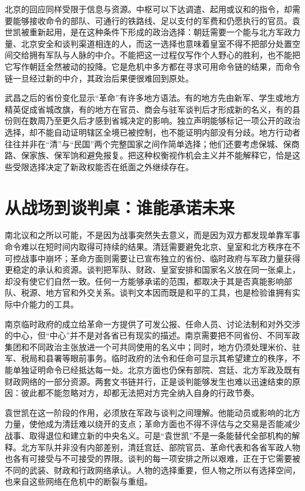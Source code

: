 北京的回应同样受限于信息与资源。中枢可以下达调遣、起用或议和的指令，却需要能够接收命令的部队、可通行的铁路线、足以支付的军费和仍愿执行的官员。袁世凯被重新起用，是在这种条件下形成的政治选择：朝廷需要一个能与北方军政力量、北京安全和谈判渠道相连的人，而这一选择也意味着皇室不得不把部分处置空间交给拥有军队与人脉的中介。不能把这一过程仅写作个人野心的胜利，也不能把它写作朝廷全然被动的投降。它是危机中多方都在寻求可用命令链的结果，而命令链一旦经过新的中介，其政治后果便很难回到原处。

武昌之后的省份变化显示“革命”有许多地方语法。有的地方先由新军、学生或地方精英促成省城改旗，有的地方在官员、商会与驻军谈判后才形成新的名义，有的县份则在数周乃至更久后才感到省城决定的影响。独立声明能够标记一项公开的政治选择，却不能自动证明辖区全境已被控制，也不能证明内部没有分歧。地方行动者往往并非在“清”与“民国”两个完整国家之间作简单选择；他们还要考虑保城、保商路、保家族、保军饷和避免报复。把这种权衡视作机会主义并不能解释它，恰是这些受限选择决定了新政权能否在纸面之外继续存在。

\section{从战场到谈判桌：谁能承诺未来}

南北议和之所以可能，不是因为战事突然失去意义，而是因为双方都发现单靠军事命令难以在短时间内取得可持续的结果。清廷需要避免北京、皇室和北方秩序在不可控战事中崩坏；革命方面则需要让已宣布独立的省份、临时政府与军政力量获得更稳定的承认和资源。谈判把军队、财政、皇室安排和国家名义放在同一张桌上，却没有使它们自然一致。任何一方能够承诺的范围，都取决于其是否真能影响部队、税源、地方官和外交关系。谈判文本因而既是和平的工具，也是检验谁拥有实际中介能力的工具。

南京临时政府的成立给革命一方提供了可发公报、任命人员、讨论法制和对外交涉的中心，但“中心”并不是对各省已有现实的描述。南京需要把不同省份、不同军政集团和不同政治主张放进一个可共同使用的名义中；同时，地方仍须处理米价、驻军、税局和县署等眼前事务。临时政府的法令和任命可显示其希望建立的秩序，不能单独证明命令已经抵达每一处。北京方面也仍保有部院、宫廷、北方军政及既有财政网络的一部分资源。两套文书链并行，正是谈判能够发生也难以迅速结束的原因：彼此都不能忽略对方，却都无法把对方完全纳入自身的行政节奏。

袁世凯在这一阶段的作用，必须放在军政与谈判之间理解。他能动员或影响的北方力量，使他成为清廷难以绕开的支点；革命方面也不得不评估与之交易是否能减少战事、取得退位和建立新的中央名义。可是“袁世凯”不是一条能替代全部机构的解释。北方军队并非没有内部差别，清廷宫廷、部院官员、革命代表和各省军政人物也各有可接受与不可接受的界限。谈判的每一项安排之所以艰难，正在于它需要被不同的武装、财政和行政网络承认。人物的选择重要，但人物之所以有选择空间，也来自这些网络在危机中的断裂与重组。

